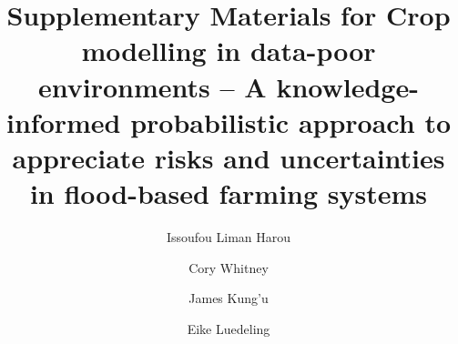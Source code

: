 \documentclass[]{elsarticle} %
\begin{document}
\begin{frontmatter}

  \title{Supplementary Materials for Crop modelling in data-poor environments -- A knowledge-informed probabilistic approach to appreciate risks and uncertainties in flood-based farming systems}
    \author[KU,ICRAF]{Issoufou Liman Harou}
    \author[INRES]{Cory Whitney}
    \author[KU]{James Kung'u}
    \author[INRES]{Eike Luedeling}
      \address[KU]{Kenyatta University, Department of Environmental Sciences, P.O. Box 43844 00100 Nairobi, Kenya}
    \address[ICRAF]{World Agroforestry Centre (ICRAF), United Nations Avenue, Gigiri, P.O. Box 30677-00100, Nairobi, Kenya}
    \address[INRES]{University of Bonn, Department of Horticultural Sciences, Auf dem Hügel 6, D-53121, Bonn, Germany}
    \address[ZEF]{Center for Development research (ZEF), University of Bonn, Genscherallee 3, D-53113, Bonn, Germany}
    

\end{frontmatter}
\end{document}
